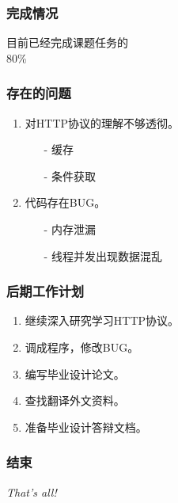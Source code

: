 \documentclass[dvipdfm]{beamer}
\begin{document}
\begin{frame}
	\begin{center}
		\frametitle{完成情况}
		\pause
		\LARGE{目前已经完成课题任务的}\\
		{\Huge  80\% }
		\\
	\end{center}
\end{frame}

\begin{frame}
	\frametitle{存在的问题}
	\begin{enumerate}
		\item 对{\cp HTTP}协议的理解不够透彻。
		\begin{itemize}
			\item[-] 缓存
			\item[-] 条件获取
		\end{itemize}
		\pause
		\item 代码存在{\cp BUG}。
		\begin{itemize}
			\item[-] 内存泄漏
			\item[-] 线程并发出现数据混乱
		\end{itemize}
	\end{enumerate}
\end{frame}

\begin{frame}
	\frametitle{后期工作计划}
	\begin{enumerate}
		\item 继续深入研究学习{\cp HTTP}协议。
		\item 调成程序，修改{\cp BUG}。
		\item 编写毕业设计论文。
		\item 查找翻译外文资料。
		\item 准备毕业设计答辩文档。
	\end{enumerate}
\end{frame}

\begin{frame}
	\frametitle{结束}
	\begin{center}
	{\Huge
		\textsl{{\cp That's all!}}
	}
	\end{center}
\end{frame}
\end{document}
